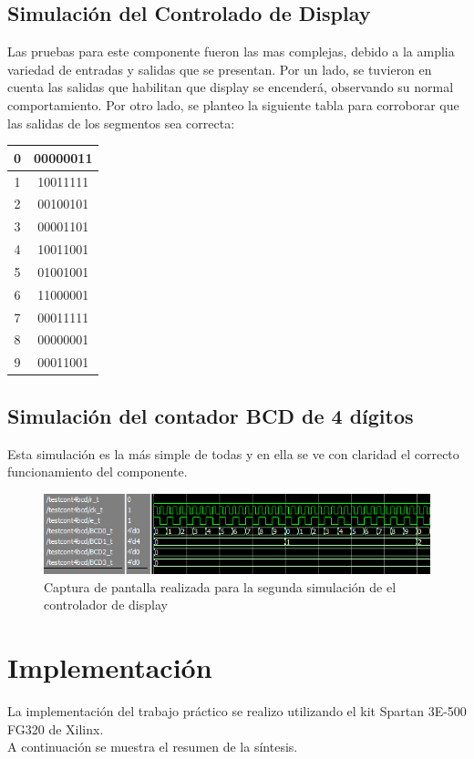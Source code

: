 \documentclass[a4paper,10pt]{article}
\begin{document}
	\subsection{Simulación del Controlado de Display}
	Las pruebas para este componente fueron las mas complejas, debido a la amplia variedad de entradas y salidas que se presentan. Por un lado, se tuvieron en cuenta las salidas que habilitan que display se encenderá, observando su normal comportamiento. Por otro lado, se planteo la siguiente tabla para corroborar que las salidas de los segmentos sea correcta:
		\begin{center}
			\begin{tabular}{|c|c|}
				\hline
				0 & 00000011 \\ \hline
				1 & 10011111 \\ \hline
				2 & 00100101 \\ \hline
				3 & 00001101 \\ \hline
				4 & 10011001 \\ \hline
				5 & 01001001 \\ \hline
				6 & 11000001 \\ \hline
				7 & 00011111 \\ \hline
				8 & 00000001 \\ \hline
				9 & 00011001 \\ \hline
			\end{tabular}
		\end{center}
	\subsection{Simulación del contador BCD de 4 dígitos}
	Esta simulación es la más simple de todas y en ella se ve con claridad el correcto funcionamiento del componente.
	\begin{figure}[H]
		\centering
		\includegraphics[scale=0.5]{sim-cont.png}
		\caption{Captura de pantalla realizada para la segunda simulación de el controlador de display}
		\label{fig:sim_cont}
	\end{figure}
	
\section{Implementación}
La implementación del trabajo práctico se realizo utilizando el kit Spartan 3E-500 FG320 de Xilinx.  \\
A continuación se muestra el resumen de la síntesis.
	
\end{document}
